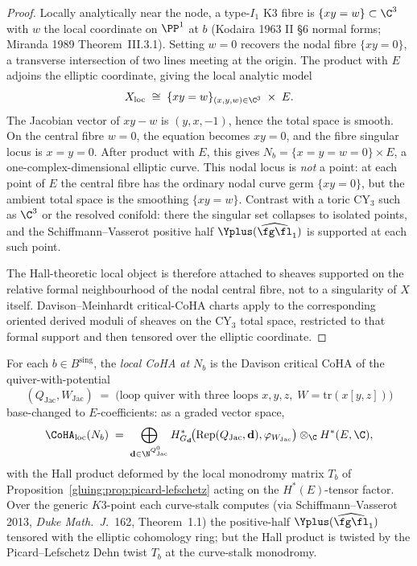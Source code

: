 \begin{proof}
Locally analytically near the node, a type-$I_1$ K3 fibre is
$\{xy = w\} \subset \C^3$ with $w$ the local coordinate on $\PP^1$
at $b$ (Kodaira 1963 II \S 6 normal forms; Miranda 1989 Theorem~III.3.1).
Setting $w = 0$ recovers the nodal fibre $\{xy = 0\}$, a transverse
intersection of two lines meeting at the origin. The product with
$E$ adjoins the elliptic coordinate, giving the local analytic model
\[
 X_{\text{loc}} \;\cong\; \{xy = w\}_{(x, y, w) \in \C^3}
 \;\times\; E.
\]
The Jacobian vector of \(xy-w\) is \((y,x,-1)\), hence the total
space is smooth. On the central fibre \(w=0\), the equation becomes
\(xy=0\), and the fibre singular locus is \(x=y=0\). After product
with \(E\), this gives \(N_b=\{x=y=w=0\}\times E\), a
one-complex-dimensional elliptic curve. This nodal locus is
\emph{not} a point: at each point of \(E\) the central fibre has the
ordinary nodal curve germ \(\{xy=0\}\), but the ambient total space is
the smoothing \(\{xy=w\}\).
Contrast with a toric CY$_3$ such as $\C^3$ or the resolved
conifold: there the singular set collapses to isolated points, and
the Schiffmann--Vasserot positive half $\Yplus(\widehat{\fg\fl}_1)$
is supported at each such point.

The Hall-theoretic local object is therefore attached to sheaves
supported on the relative formal neighbourhood of the nodal central
fibre, not to a singularity of \(X\) itself. Davison--Meinhardt
critical-CoHA charts apply to the corresponding oriented derived
moduli of sheaves on the CY$_3$ total space, restricted to that formal
support and then tensored over the elliptic coordinate.
\end{proof}

\begin{definition}
\label{gluing:def:local-CoHA-curve-stalk}
For each $b \in B^{\mathrm{sing}}$, the \emph{local CoHA at $N_b$} is
the Davison critical CoHA of the quiver-with-potential
\[
 (Q_{\text{Jac}}, W_{\text{Jac}}) \;=\; \bigl(\text{loop quiver with
 three loops } x, y, z,\; W = \mathrm{tr}(x[y, z])\bigr)
\]
base-changed to $E$-coefficients: as a graded vector space,
\[
 \CoHA_{\text{loc}}(N_b) \;=\;
 \bigoplus_{\mathbf d \in \N^{Q_{\text{Jac}}^0}}
 H^*_{G_{\mathbf d}}\!\bigl(\mathrm{Rep}(Q_{\text{Jac}}, \mathbf d),
 \varphi_{W_{\text{Jac}}}\bigr) \otimes_\C H^*(E, \C),
\]
with the Hall product deformed by the local monodromy matrix $T_b$ of
Proposition~\ref{gluing:prop:picard-lefschetz} acting on the $H^*(E)$-tensor
factor. Over the generic $K3$-point each curve-stalk computes (via
Schiffmann--Vasserot 2013, \emph{Duke Math.\ J.}~162, Theorem~1.1)
the positive-half $\Yplus(\widehat{\fg\fl}_1)$ tensored with the
elliptic cohomology ring; but the Hall product is twisted by the
Picard--Lefschetz Dehn twist $T_b$ at the curve-stalk monodromy.
\end{definition}

